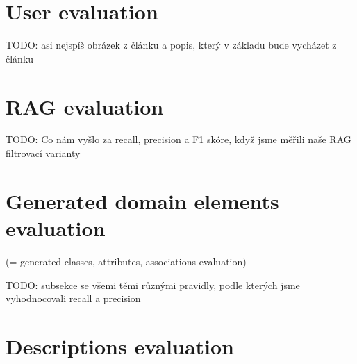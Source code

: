\section{User evaluation}

TODO: asi nejspíš obrázek z článku a popis, který v základu bude vycházet z článku

\section{RAG evaluation}

TODO: Co nám vyšlo za recall, precision a F1 skóre, když jsme měřili naše RAG filtrovací varianty \\


\section{Generated domain elements evaluation}
(= generated classes, attributes, associations evaluation)

TODO: subsekce se všemi těmi různými pravidly, podle kterých jsme vyhodnocovali recall a precision \\

\section{Descriptions evaluation}
